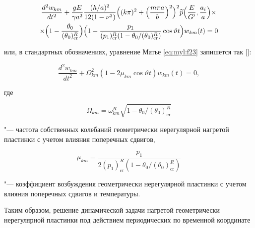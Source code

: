 \begin{multline}

\label{eq:myl:f23}

\frac{d^2 w_{km}}{dt^2}+\frac{gE}{\gamma a^2}\frac{({h}/{a})^2}{12(1-\nu^2)}

\Bigl((k\pi)^2+\Bigl(\frac{m\pi a}{b}\Bigr)^2\Bigr)^2 

\widetilde{p}\Bigl(\frac{E}{G'}, \frac{a_i}{a}\Bigr)\times\\

 \times\Bigl(1-\frac{\theta_0}{(\theta_0)_{\text{cr}}^R}\Bigr)

 \Bigl(1-\frac{p_1}{(p_1)_{\text{cr}}^R (1- {\theta_0}/{(\theta_0)_{\text{cr}}^R})}\cos\vartheta t\Bigr)w_{km}(t)=0

\end{multline}

или, в стандартных обозначениях, уравнение Матье \eqref{eq:myl:f23} запишется так []:

\begin{equation}\label{eq:myl:f24}

    \frac{d^2 w_{km}}{d t^2}+\Omega_{km}^2\left(1-2\mu_{km}\cos\vartheta t\right)w_{km}(t)=0,

\end{equation}

где

\begin{equation}\label{eq:myl:f25}

    \Omega_{km}=\omega_{km}^R\sqrt{1-{\theta_0}/{(\theta_0)_{\text{cr}}^R}} 

\end{equation}

"--- частота собственных колебаний геометрически нерегулярной нагретой пластинки с учетом влияния поперечных сдвигов,

\begin{equation}\label{eq:myl:f26}

    \mu_{km}=\frac{p_1}{2(p_1)_{\text{cr}}^R 

    (1-{\theta_0}/{(\theta_0)_{\text{cr}}^R})}

\end{equation}

"--- коэффициент возбуждения геометрически нерегулярной пластинки с учетом влияния поперечных сдвигов и температуры.



Таким образом, решение динамической задачи нагретой геометрически нерегулярной пластинки под действием периодических по временной координате

